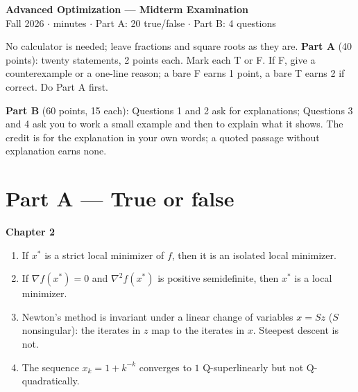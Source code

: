 \documentclass[11pt,a4paper]{article}
\newcommand{\gradf}{\nabla f}
\newcommand{\hessf}{\nabla^{2} f}
\newcommand{\versionlabel}{}
\begin{document}
\begin{center}
  {\LARGE\bfseries Advanced Optimization --- Midterm Examination \versionlabel}\\[4pt]
  Fall 2026 \quad $\cdot$  minutes \quad $\cdot$ \quad Part A: 20 true/false \quad $\cdot$ \quad Part B: 4 questions
\end{center}

\medskip
\noindent No calculator is needed; leave fractions and square roots as they are.
\textbf{Part A} (40 points): twenty statements, 2 points each. Mark each T or F. If F, give a counterexample or a one-line reason; a bare F earns 1 point, a bare T earns 2 if correct.
Do Part A first.

\noindent\textbf{Part B} (60 points, 15 each): Questions 1 and 2 ask for explanations; Questions 3 and 4 ask you to work a small example and then to explain what it shows.
The credit is for the explanation in your own words; a quoted passage without explanation earns none.

\bigskip
\section*{Part A --- True or false}

\textbf{Chapter 2}
\begin{enumerate}
\item If $x^{*}$ is a strict local minimizer of $f$, then it is an isolated local minimizer.

\item If $\gradf(x^{*})=0$ and $\hessf(x^{*})$ is positive semidefinite, then $x^{*}$ is a local minimizer.

\item Newton's method is invariant under a linear change of variables $x=Sz$ ($S$ nonsingular): the iterates in $z$ map to the iterates in $x$. Steepest descent is not.

\item The sequence $x_{k}=1+k^{-k}$ converges to $1$ Q-superlinearly but not Q-quadratically.
\end{enumerate}
\end{document}
